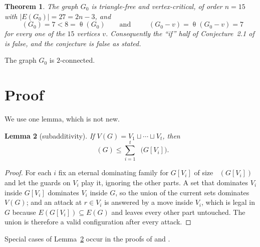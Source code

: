 \documentclass[11pt]{amsart}
\newtheorem{theorem}{Theorem}
\newtheorem{lemma}[theorem]{Lemma}
\theoremstyle{remark}
\DeclareMathOperator{\edom}{\gamma^{\infty}}
\DeclareMathOperator{\thet}{\theta}
\newcommand{\Gz}{G_0}
\begin{document}
\begin{theorem}\label{thm:main}
The graph $\Gz$ is triangle-free and vertex-critical, of order $n=15$ with
$|E(\Gz)|=27=2n-3$, and
\[
  \edom(\Gz)=7<8=\thet(\Gz)
  \qquad\text{and}\qquad
  \edom(\Gz-v)=\thet(\Gz-v)=7
\]
for every one of the $15$ vertices $v$.
Consequently the ``if'' half of Conjecture~2.1 of \cite{KMS} is false, and the conjecture is
false as stated.
\end{theorem}

The graph $\Gz$ is $2$-connected.

\section{Proof}

We use one lemma, which is not new.

\begin{lemma}[subadditivity]\label{lem:S}
If $V(G)=V_1\sqcup\cdots\sqcup V_t$, then
\[
  \edom(G)\le\sum_{i=1}^{t}\edom\bigl(G[V_i]\bigr).
\]
\end{lemma}

\begin{proof}
For each $i$ fix an eternal dominating family for $G[V_i]$ of size $\edom(G[V_i])$ and let the
guards on $V_i$ play it, ignoring the other parts. A set that dominates $V_i$ inside $G[V_i]$
dominates $V_i$ inside $G$, so the union of the current sets dominates $V(G)$; and an attack at
$r\in V_i$ is answered by a move inside $V_i$, which is legal in $G$ because
$E(G[V_i])\subseteq E(G)$ and leaves every other part untouched. The union is therefore a valid
configuration after every attack.
\end{proof}

Special cases of Lemma~\ref{lem:S} occur in the proofs of \cite[Proposition 2.1]{KMS} and
\cite[Corollary 5.1]{MMV}.
\end{document}
